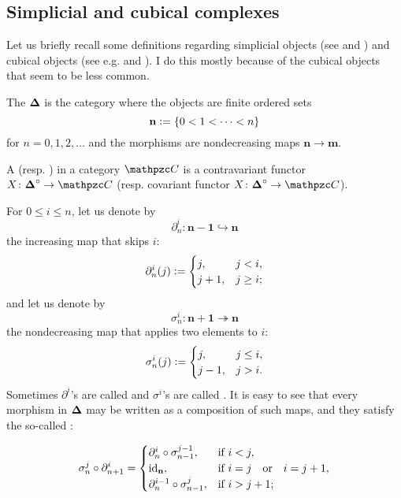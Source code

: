 \subsection*{Simplicial and cubical complexes}

Let us briefly recall some definitions regarding simplicial objects
(see \cite{May-Simplicial} and \cite{Goerss-Jardine}) and cubical objects
(see e.g. \cite{Cisinski-prefaisceaux} and \cite{Brown-Higgins-Sivera}).
I do this mostly because of the cubical objects that seem to be less common.

\begin{definition}
  The  ${\boldsymbol\Delta}$ is the category where the objects are
  finite ordered sets
  $$\mathbf{n} \mathrel{\mathop:}= \{ 0 < 1 < \cdots < n \}$$
  for $n = 0, 1, 2, \ldots$ and the morphisms are nondecreasing maps
  $\mathbf{n}\to \mathbf{m}$.

  A  (resp. )  in a category
  $\vcateg{C}$ is a contravariant functor $X\colon \bDelta^\circ \to \vcateg{C}$
  (resp. covariant functor $X\colon \bDelta^\circ \to \vcateg{C}$).
\end{definition}

For $0 \le i \le n$, let us denote by
$$\partial^i_n \colon \mathbf{n-1} \hookrightarrow \mathbf{n}$$
the increasing map that skips $i$:
\[ \partial^i_n (j) \mathrel{\mathop:}= \begin{cases}
    j, & j < i, \\
    j+1, & j \ge i;
  \end{cases} \]
and let us denote by
$$\sigma^i_n \colon \mathbf{n+1} \twoheadrightarrow \mathbf{n}$$
the nondecreasing map that applies two elements to $i$:
\[ \sigma^i_n (j) \mathrel{\mathop:}= \begin{cases}
    j, & j \le i, \\
    j-1, & j > i.
  \end{cases} \]
Sometimes $\partial^i$'s are called  and $\sigma^i$'s are
called . It is easy to see that every morphism in
${\boldsymbol\Delta}$ may be written as a composition of such maps, and they satisfy the
so-called :

\begin{equation}
  \label{eqn:cosimplicial-identity-1}
  \sigma^j_n \circ \partial^i_{n+1}
  = \begin{cases}
    \partial^i_n \circ \sigma^{j-1}_{n-1}, & \text{if }i < j, \\
    \mathrm{id}_{\mathbf{n}}, & \text{if }i = j \quad\text{or}\quad i = j+1, \\
    \partial^{i-1}_n \circ \sigma^j_{n-1}, & \text{if }i > j + 1;
  \end{cases}
\end{equation}

